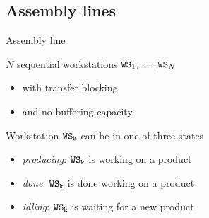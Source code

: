   \subsection{Assembly lines}
    \begin{frame}{Assembly line}
      \begin{center}\scalebox{0.9}{}\end{center}
      
      \vspace{1em}
      \begin{minipage}{0.6\textwidth}
        $N$ sequential workstations $\mathtt{WS}_1, \dots, \mathtt{WS}_N$
        \begin{itemize}
          \item with transfer blocking
          \item and no buffering capacity
        \end{itemize}
        
        \vspace{1em}
        Workstation $\mathtt{WS_k}$ can be in one of three states
        \begin{itemize}
          \item \textit{producing}: $\mathtt{WS_k}$ is working on a product
          \item \textit{done}: $\mathtt{WS_k}$ is done working on a product
          \item \textit{idling}: $\mathtt{WS_k}$ is waiting for a new product
        \end{itemize}
      \end{minipage}
      \begin{minipage}{0.35\textwidth}
        \begin{center}\scalebox{0.8}{}\end{center}
    \end{minipage}
    \end{frame}
    
